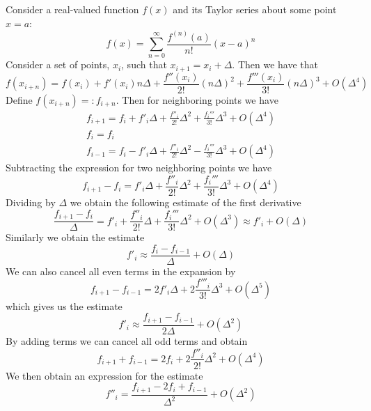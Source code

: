 \documentclass[12pt]{report}
\begin{document}
\begin{proc}{}{}
        Consider a real-valued function $f(x)$ and its Taylor series about some point $x=a$:\begin{equation}
                f(x) = \sum_{n=0}^{\infty}\frac{f^{(n)}(a)}{n!}(x-a)^n
        \end{equation}
        Consider a set of points, $x_i$, such that $x_{i+1} = x_i + \Delta$. Then we have that \begin{equation}
                f(x_{i+n}) = f(x_i) + f'(x_i)n\Delta + \frac{f''(x_i)}{2!}(n\Delta)^2+\frac{f'''(x_i)}{3!}(n\Delta)^3+O(\Delta^4)
        \end{equation}
        Define $f(x_{i+n}) =: f_{i+n}$. Then for neighboring points we have \begin{align}
                f_{i+1} = f_i+f'_i\Delta +\frac{f''_i}{2!}\Delta^2 + \frac{f_i'''}{3!}\Delta^3 + O(\Delta^4) \\
                f_i = f_i \\
                f_{i-1} = f_i-f'_i\Delta +\frac{f''_i}{2!}\Delta^2 - \frac{f_i'''}{3!}\Delta^3 + O(\Delta^4)
        \end{align}
        Subtracting the expression for two neighboring points we have \begin{equation}
                f_{i+1} - f_i = f'_i\Delta +\frac{f''_i}{2!}\Delta^2 + \frac{f_i'''}{3!}\Delta^3 + O(\Delta^4)
        \end{equation}
        Dividing by $\Delta$ we obtain the following  estimate of the first derivative \begin{equation}
                \frac{f_{i+1} - f_i}{\Delta} = f'_i+\frac{f''_i}{2!}\Delta + \frac{f_i'''}{3!}\Delta^2 + O(\Delta^3) \approx f'_i + O(\Delta)
        \end{equation}
        Similarly we obtain the  estimate \begin{equation}
                f'_i \approx \frac{f_i - f_{i-1}}{\Delta} + O(\Delta)
        \end{equation}
        We can also cancel all even terms in the expansion by \begin{equation}
                f_{i+1} - f_{i-1} = 2f'_i\Delta +2\frac{f'''_i}{3!}\Delta^3+O(\Delta^5)
        \end{equation}
        which gives us the  estimate \begin{equation}
                f'_i \approx \frac{f_{i+1} - f_{i-1}}{2\Delta} + O(\Delta^2)
        \end{equation}
        By adding terms we can cancel all odd terms and obtain \begin{equation}
                f_{i+1} + f_{i-1} = 2f_i + 2\frac{f''_i}{2!}\Delta^2 + O(\Delta^4)
        \end{equation}
        We then obtain an expression for the  estimate \begin{equation}
                f''_i = \frac{f_{i+1} - 2f_i + f_{i-1}}{\Delta^2} + O(\Delta^2)
        \end{equation}
\end{proc}
\end{document}
